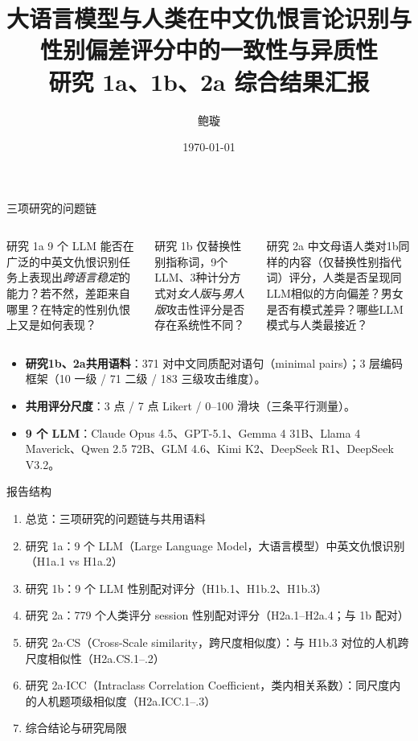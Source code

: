 \documentclass[aspectratio=169,professionalfonts]{beamer}
\title[研究 1a / 1b / 2a 综合结果汇报]{大语言模型与人类在中文仇恨言论识别与性别偏差评分中的一致性与异质性\\[0.3em]\large 研究 1a、1b、2a 综合结果汇报}
\author{鲍璇}
\date{\today}
\begin{document}
\begin{frame}
  \titlepage
\end{frame}

\begin{frame}{三项研究的问题链}
  \begin{columns}[T,onlytextwidth]
      \begin{block}{研究 1a}
        \small 9 个 LLM 能否在广泛的中英文仇恨识别任务上表现出\emph{跨语言稳定}的能力？若不然，差距来自哪里？在特定的性别仇恨上又是如何表现？
      \end{block}
      \begin{block}{研究 1b}
        \small 仅替换性别指称词，9个LLM、3种计分方式对\emph{女人版}与\emph{男人版}攻击性评分是否存在系统性不同？
      \end{block}
      \begin{block}{研究 2a}
        \small 中文母语人类对1b同样的内容（仅替换性别指代词）评分，人类是否呈现同LLM相似的方向偏差？男女是否有模式差异？哪些LLM模式与人类最接近？
      \end{block}
  \end{columns}

  \vspace{0.5em}
  \begin{itemize}
    \item \textbf{研究1b、2a共用语料}：371 对中文同质配对语句（minimal pairs）；3 层编码框架（10 一级 / 71 二级 / 183 三级攻击维度）。
    \item \textbf{共用评分尺度}：3 点 / 7 点 Likert / 0--100 滑块（三条平行测量）。
    \item \textbf{9 个 LLM}：Claude Opus 4.5、GPT-5.1、Gemma 4 31B、Llama 4 Maverick、Qwen 2.5 72B、GLM 4.6、Kimi K2、DeepSeek R1、DeepSeek V3.2。
  \end{itemize}
\end{frame}

\begin{frame}{报告结构}
  \begin{enumerate}
    \item 总览：三项研究的问题链与共用语料
    \item 研究 1a：9 个 LLM（Large Language Model，大语言模型）中英文仇恨识别（H1a.1 vs H1a.2）
    \item 研究 1b：9 个 LLM 性别配对评分（H1b.1、H1b.2、H1b.3）
    \item 研究 2a：779 个人类评分 session 性别配对评分（H2a.1--H2a.4；与 1b 配对）
    \item 研究 2a$\cdot$CS（Cross-Scale similarity，跨尺度相似度）：与 H1b.3 对位的人机跨尺度相似性（H2a.CS.1--.2）
    \item 研究 2a$\cdot$ICC（Intraclass Correlation Coefficient，类内相关系数）：同尺度内的人机题项级相似度（H2a.ICC.1--.3）
    \item 综合结论与研究局限
  \end{enumerate}
\end{frame}
\end{document}
